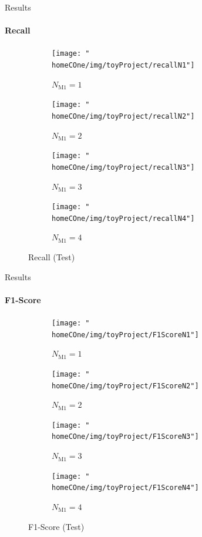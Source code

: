 \documentclass{beamer} %
\newcommand{\homeCOne}{../../Chapter 1 - Metalabeling/Draft}
\begin{document}
\begin{frame}{Results}
\framesubtitle{Recall}
\begin{figure}[htbp]
	\centering
	\begin{subfigure}{.5\textwidth}
	\centering
		\texttt{[image: "\\homeCOne/img/toyProject/recallN1"]}
	  	\caption{$N_{\text{M1}} = 1$}
	  	\label{fig:precisionN1}
	\end{subfigure}%
	\begin{subfigure}{.5\textwidth}
	\centering
		\texttt{[image: "\\homeCOne/img/toyProject/recallN2"]}
		\caption{$N_{\text{M1}} = 2$}
	\end{subfigure}


	\begin{subfigure}{.5\textwidth}
	\centering
		\texttt{[image: "\\homeCOne/img/toyProject/recallN3"]}
		\caption{$N_{\text{M1}} = 3$}
	\end{subfigure}%
	\begin{subfigure}{.5\textwidth}
	\centering
		\texttt{[image: "\\homeCOne/img/toyProject/recallN4"]}
		\caption{$N_{\text{M1}} = 4$}
	\end{subfigure}
	\caption{Recall (Test)}
\end{figure}

\end{frame}

\begin{frame}{Results}
\framesubtitle{F1-Score}
\begin{figure}[htbp]
	\centering
	\begin{subfigure}{.5\textwidth}
	\centering
		\texttt{[image: "\\homeCOne/img/toyProject/F1ScoreN1"]}
	  	\caption{$N_{\text{M1}} = 1$}
	\end{subfigure}%
	\begin{subfigure}{.5\textwidth}
	\centering
		\texttt{[image: "\\homeCOne/img/toyProject/F1ScoreN2"]}
		\caption{$N_{\text{M1}} = 2$}
	\end{subfigure}

	\vspace{.2cm}

	\begin{subfigure}{.5\textwidth}
	\centering
		\texttt{[image: "\\homeCOne/img/toyProject/F1ScoreN3"]}
		\caption{$N_{\text{M1}} = 3$}
	\end{subfigure}%
	\begin{subfigure}{.5\textwidth}
	\centering
		\texttt{[image: "\\homeCOne/img/toyProject/F1ScoreN4"]}
		\caption{$N_{\text{M1}} = 4$}
	\end{subfigure}
	\caption{F1-Score (Test)}
\end{figure}

\end{frame}
\end{document}
